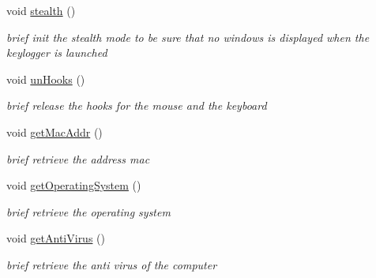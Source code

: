 \begin{DoxyCompactItemize}
\mbox{\label{classspider_1_1_windows_key_logger_a699c9f2fa9aab63831800e469a18d1b7}} 
void \hyperlink{classspider_1_1_windows_key_logger_a699c9f2fa9aab63831800e469a18d1b7}{stealth} ()
\begin{DoxyCompactList}\small\item\em brief init the stealth mode to be sure that no windows is displayed when the keylogger is launched \end{DoxyCompactList}\item 
\mbox{\label{classspider_1_1_windows_key_logger_a246e51a525ed1fa8cb5cc4bb0d742728}} 
void \hyperlink{classspider_1_1_windows_key_logger_a246e51a525ed1fa8cb5cc4bb0d742728}{un\+Hooks} ()
\begin{DoxyCompactList}\small\item\em brief release the hooks for the mouse and the keyboard \end{DoxyCompactList}\item 
\mbox{\label{classspider_1_1_windows_key_logger_afd03217a7f132d74ba5fc267d2f7c7b8}} 
void \hyperlink{classspider_1_1_windows_key_logger_afd03217a7f132d74ba5fc267d2f7c7b8}{get\+Mac\+Addr} ()
\begin{DoxyCompactList}\small\item\em brief retrieve the address mac \end{DoxyCompactList}\item 
\mbox{\label{classspider_1_1_windows_key_logger_a5de75e11537f6e2e2ea7898e53c27367}} 
void \hyperlink{classspider_1_1_windows_key_logger_a5de75e11537f6e2e2ea7898e53c27367}{get\+Operating\+System} ()
\begin{DoxyCompactList}\small\item\em brief retrieve the operating system \end{DoxyCompactList}\item 
\mbox{\label{classspider_1_1_windows_key_logger_a9a53d2ecdc34f01fa34bc109187e9aac}} 
void \hyperlink{classspider_1_1_windows_key_logger_a9a53d2ecdc34f01fa34bc109187e9aac}{get\+Anti\+Virus} ()
\begin{DoxyCompactList}\small\item\em brief retrieve the anti virus of the computer \end{DoxyCompactList}\item 

\end{DoxyCompactItemize}
